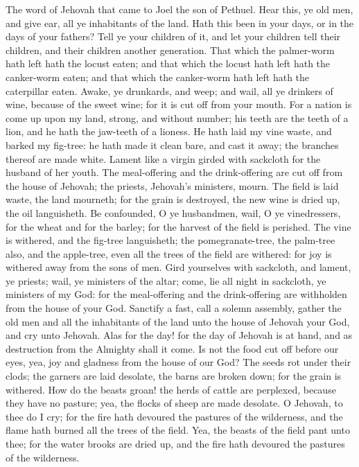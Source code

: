 


The word of Jehovah that came to Joel the son of Pethuel.  Hear this, ye old men, and give ear, all ye inhabitants of the land. Hath this been in your days, or in the days of your fathers? Tell ye your children of it, and let your children tell their children, and their children another generation. That which the palmer-worm hath left hath the locust eaten; and that which the locust hath left hath the canker-worm eaten; and that which the canker-worm hath left hath the caterpillar eaten.  Awake, ye drunkards, and weep; and wail, all ye drinkers of wine, because of the sweet wine; for it is cut off from your mouth. For a nation is come up upon my land, strong, and without number; his teeth are the teeth of a lion, and he hath the jaw-teeth of a lioness. He hath laid my vine waste, and barked my fig-tree: he hath made it clean bare, and cast it away; the branches thereof are made white.  Lament like a virgin girded with sackcloth for the husband of her youth. The meal-offering and the drink-offering are cut off from the house of Jehovah; the priests, Jehovah’s ministers, mourn. The field is laid waste, the land mourneth; for the grain is destroyed, the new wine is dried up, the oil languisheth. Be confounded, O ye husbandmen, wail, O ye vinedressers, for the wheat and for the barley; for the harvest of the field is perished. The vine is withered, and the fig-tree languisheth; the pomegranate-tree, the palm-tree also, and the apple-tree, even all the trees of the field are withered: for joy is withered away from the sons of men.  Gird yourselves with sackcloth, and lament, ye priests; wail, ye ministers of the altar; come, lie all night in sackcloth, ye ministers of my God: for the meal-offering and the drink-offering are withholden from the house of your God. Sanctify a fast, call a solemn assembly, gather the old men and all the inhabitants of the land unto the house of Jehovah your God, and cry unto Jehovah.  Alas for the day! for the day of Jehovah is at hand, and as destruction from the Almighty shall it come. Is not the food cut off before our eyes, yea, joy and gladness from the house of our God? The seeds rot under their clods; the garners are laid desolate, the barns are broken down; for the grain is withered. How do the beasts groan! the herds of cattle are perplexed, because they have no pasture; yea, the flocks of sheep are made desolate. O Jehovah, to thee do I cry; for the fire hath devoured the pastures of the wilderness, and the flame hath burned all the trees of the field. Yea, the beasts of the field pant unto thee; for the water brooks are dried up, and the fire hath devoured the pastures of the wilderness. 

